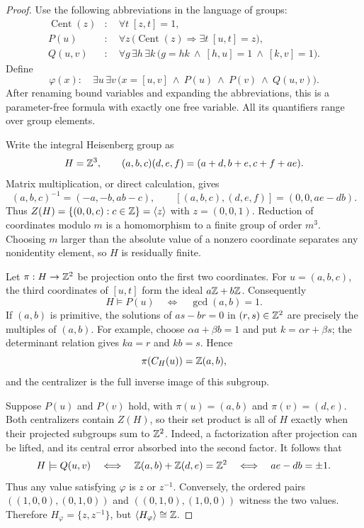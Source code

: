 \begin{proof}
Use the following abbreviations in the language of groups:
\begin{align*}
\operatorname{Cent}(z)&:\quad \forall t\;[z,t]=1,\\
P(u)&:\quad \forall z\,
 \bigl(\operatorname{Cent}(z)\Longrightarrow
                  \exists t\;[u,t]=z\bigr),\\
Q(u,v)&:\quad \forall g\,\exists h\,\exists k\,
 \bigl(g=hk\ \wedge\ [h,u]=1\ \wedge\ [k,v]=1\bigr).
\end{align*}
Define
\[
\varphi(x):\quad \exists u\,\exists v\,
 \bigl(x=[u,v]\ \wedge\ P(u)\ \wedge\ P(v)\ \wedge\ Q(u,v)\bigr).
\]
After renaming bound variables and expanding the abbreviations,
this is a parameter-free formula with exactly one free variable.
All its quantifiers range over group elements.

Write the integral Heisenberg group as
\[
H=\mathbb Z^3,\qquad
(a,b,c)(d,e,f)=(a+d,b+e,c+f+ae).
\]
Matrix multiplication, or direct calculation, gives
\[
(a,b,c)^{-1}=(-a,-b,ab-c),\qquad
[(a,b,c),(d,e,f)]=(0,0,ae-db).
\]
Thus $Z(H)=\{(0,0,c):c\in\mathbb Z\}=\langle z\rangle$ with
$z=(0,0,1)$. Reduction of coordinates modulo $m$ is a homomorphism
to a finite group of order $m^3$. Choosing $m$ larger than the
absolute value of a nonzero coordinate separates any nonidentity
element, so $H$ is residually finite.

Let $\pi:H\to\mathbb Z^2$ be projection onto the first two coordinates.
For $u=(a,b,c)$, the third coordinates of $[u,t]$ form the ideal
$a\mathbb Z+b\mathbb Z$. Consequently
\[
H\models P(u)\quad\Longleftrightarrow\quad \gcd(a,b)=1.
\]
If $(a,b)$ is primitive, the solutions of $as-br=0$ in
$(r,s)\in\mathbb Z^2$ are precisely the multiples of $(a,b)$.
For example, choose $\alpha a+\beta b=1$ and put
$k=\alpha r+\beta s$; the determinant relation gives
$ka=r$ and $kb=s$. Hence
\[
\pi(C_H(u))=\mathbb Z(a,b),
\]
and the centralizer is the full inverse image of this subgroup.

Suppose $P(u)$ and $P(v)$ hold, with
$\pi(u)=(a,b)$ and $\pi(v)=(d,e)$.
Both centralizers contain $Z(H)$, so their set product is all of
$H$ exactly when their projected subgroups sum to $\mathbb Z^2$.
Indeed, a factorization after projection can be lifted, and its
central error absorbed into the second factor. It follows that
\[
H\models Q(u,v)
\quad\Longleftrightarrow\quad
\mathbb Z(a,b)+\mathbb Z(d,e)=\mathbb Z^2
\quad\Longleftrightarrow\quad ae-db=\pm1.
\]
Thus any value satisfying $\varphi$ is $z$ or $z^{-1}$.
Conversely, the ordered pairs
$((1,0,0),(0,1,0))$ and $((0,1,0),(1,0,0))$
witness the two values. Therefore
$H_\varphi=\{z,z^{-1}\}$, but
$\langle H_\varphi\rangle\cong\mathbb Z$.
\end{proof}

